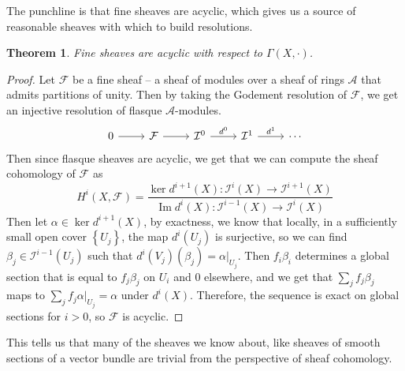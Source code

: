 \documentclass[psamsfonts, 12pt]{amsart}
\newtheorem{thm}{Theorem}[section]
\theoremstyle{definition}
\theoremstyle{remark}
\newcommand{\set}[1]{\left\lbrace #1 \right\rbrace}
\DeclareMathOperator{\im}{Im}
\begin{document}
%
The punchline is that fine sheaves are acyclic, which gives us a source of reasonable
sheaves with which to build resolutions.
%
\begin{thm}
Fine sheaves are acyclic with respect to $\Gamma(X,\cdot)$.
\end{thm}
%
\begin{proof}
Let $\mathcal{F}$ be a fine sheaf -- a sheaf of modules over a sheaf of rings
$\mathcal{A}$ that admits partitions of unity. Then by taking the
Godement resolution of $\mathcal{F}$, we get an injective resolution of
flasque $\mathcal{A}$-modules.
\[\begin{tikzcd}
0 \ar[r] & \mathcal{F} \ar[r] & \mathcal{I}^0 \ar[r, "d^0"] & \mathcal{I}^1 \ar[r, "d^1"]
& \cdots
\end{tikzcd}\]
Then since flasque sheaves are acyclic, we get that we can compute the sheaf
cohomology of $\mathcal{F}$ as
\[
H^i(X, \mathcal{F})
= \frac{\ker d^{i+1}(X) : \mathcal{I}^i(X) \to \mathcal{I}^{i+1}(X)}
{\im d^i(X) : \mathcal{I}^{i-1}(X) \to \mathcal{I}^i(X)}
\]
Then let $\alpha \in \ker d^{i+1}(X)$, by exactness, we know that locally, in a
sufficiently small open cover $\set{U_j}$, the map $d^{i}(U_j)$ is surjective,
so we can find $\beta_j \in \mathcal{I}^{i-1}(U_j)$ such that
$d^i(V_j)(\beta_j) = \alpha\vert_{U_j}$. Then $f_i\beta_i$ determines a global
section that is equal to $f_j\beta_j$ on $U_i$ and $0$ elsewhere, and we get that
$\sum_jf_j\beta_j$ maps to $\sum_j f_j\alpha\vert_{U_j} = \alpha$ under $d^i(X)$.
Therefore, the sequence is exact on global sections for $i > 0$, so $\mathcal{F}$
is acyclic.
\end{proof}
%
This tells us that many of the sheaves we know about, like sheaves of smooth sections
of a vector bundle are trivial from the perspective of sheaf cohomology.
%
\end{document}
